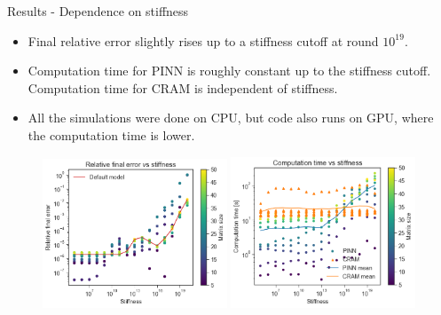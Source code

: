 \documentclass[9pt]{beamer}
\begin{document}
\begin{frame}[fragile]{Results - Dependence on stiffness}
\begin{itemize}
    \item Final relative error slightly rises up to a stiffness cutoff at round $10^{19}$.
    \item Computation time for PINN is roughly constant up to the stiffness cutoff. Computation time for CRAM is independent of stiffness.
    \item All the simulations were done on CPU, but code also runs on GPU, where the computation time is lower.
\end{itemize}
\begin{figure}
    \centering
    \includegraphics[width=0.49\textwidth]{error_vs_stiffness_multi.png}
    \includegraphics[width=0.49\textwidth]{time_vs_stiffness_multi.png}
    \label{fig:my_label}
\end{figure}
\end{frame}
\end{document}
